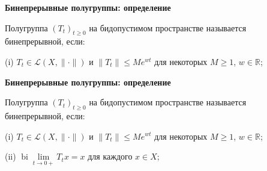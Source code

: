 \documentclass[11pt]{article}
\newcommand{\R}{\mathbb{R}}
\begin{document}
\newpage

\begin{center}
{\color{notaeYELLOW}\bfseries\fontsize{44}{52}\selectfont Бинепрерывные полугруппы: определение}
\end{center}
\vspace*{\fill}
\begin{center}
\fontsize{36}{43}\selectfont
\parbox{\linewidth}{\centering\noindent Полугруппа $(T_t)_{t\ge0}$ на бидопустимом пространстве называется бинепрерывной, если:
\par}\vspace{0.4in}
\parbox{\linewidth}{\centering\noindent (i) $T_t\in\mathcal{L}(X,\|\cdot\|)$ и $\|T_t\|\le Me^{wt}$ для некоторых $M\ge1$, $w\in\R$;
\par}\vspace{0.4in}
\end{center}
\vspace*{\fill}

\newpage

\begin{center}
{\color{notaeYELLOW}\bfseries\fontsize{44}{52}\selectfont Бинепрерывные полугруппы: определение}
\end{center}
\vspace*{\fill}
\begin{center}
\fontsize{36}{43}\selectfont
\parbox{\linewidth}{\centering\noindent Полугруппа $(T_t)_{t\ge0}$ на бидопустимом пространстве называется бинепрерывной, если:
\par}\vspace{0.4in}
\parbox{\linewidth}{\centering\noindent (i) $T_t\in\mathcal{L}(X,\|\cdot\|)$ и $\|T_t\|\le Me^{wt}$ для некоторых $M\ge1$, $w\in\R$;
\par}\vspace{0.4in}
\parbox{\linewidth}{\centering\noindent (ii) $\operatorname{bi}\lim\limits_{t\to0+}T_t x=x$ для каждого $x\in X$;
\par}\vspace{0.4in}
\end{center}
\vspace*{\fill}

\newpage
\end{document}
